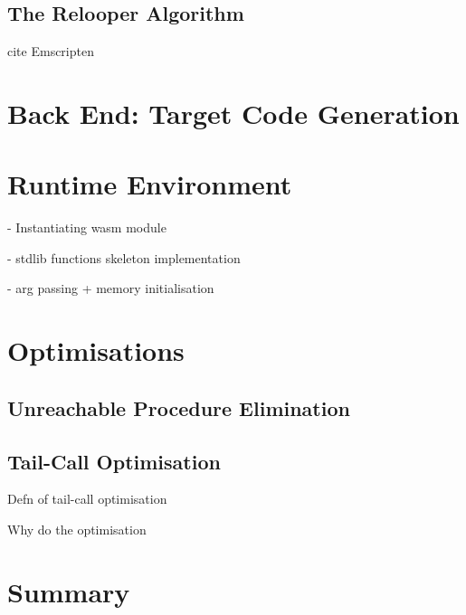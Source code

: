 \documentclass[00-main.tex]{subfiles}
\begin{document}
\subsection{The Relooper Algorithm}

\begin{mrwComment}
cite Emscripten \cite{emscripten}
\end{mrwComment}

\section{Back End: Target Code Generation}


\section{Runtime Environment}

\begin{mrwComment}
- Instantiating wasm module

- stdlib functions skeleton implementation

- arg passing + memory initialisation
\end{mrwComment}

\section{Optimisations}

\subsection{Unreachable Procedure Elimination}

\subsection{Tail-Call Optimisation}

\begin{mrwComment}
Defn of tail-call optimisation

Why do the optimisation
\end{mrwComment}

\section{Summary}
\end{document}

